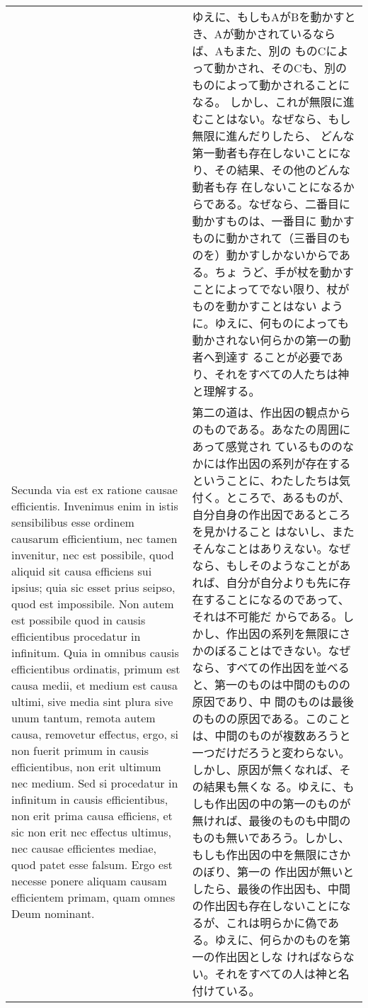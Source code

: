 \documentclass[10pt]{jsarticle}
\begin{document}
\begin{longtable}{p{21em}p{21em}}
&

ゆえに、もしもAがBを動かすとき、Aが動かされているならば、Aもまた、別の
ものCによって動かされ、そのCも、別のものによって動かされることになる。
しかし、これが無限に進むことはない。なぜなら、もし無限に進んだりしたら、
どんな第一動者も存在しないことになり、その結果、その他のどんな動者も存
在しないことになるからである。なぜなら、二番目に動かすものは、一番目に
動かすものに動かされて（三番目のものを）動かすしかないからである。ちょ
うど、手が杖を動かすことによってでない限り、杖がものを動かすことはない
ように。ゆえに、何ものによっても動かされない何らかの第一の動者へ到達す
ることが必要であり、それをすべての人たちは神と理解する。

\\

Secunda via est ex ratione causae efficientis. Invenimus enim in istis
sensibilibus esse ordinem causarum efficientium, nec tamen invenitur,
nec est possibile, quod aliquid sit causa efficiens sui ipsius; quia
sic esset prius seipso, quod est impossibile. Non autem est possibile
quod in causis efficientibus procedatur in infinitum. Quia in omnibus
causis efficientibus ordinatis, primum est causa medii, et medium est
causa ultimi, sive media sint plura sive unum tantum, remota autem
causa, removetur effectus, ergo, si non fuerit primum in causis
efficientibus, non erit ultimum nec medium. Sed si procedatur in
infinitum in causis efficientibus, non erit prima causa efficiens, et
sic non erit nec effectus ultimus, nec causae efficientes mediae, quod
patet esse falsum. Ergo est necesse ponere aliquam causam efficientem
primam, quam omnes Deum nominant.

&

第二の道は、作出因の観点からのものである。あなたの周囲にあって感覚され
ているもののなかには作出因の系列が存在するということに、わたしたちは気
付く。ところで、あるものが、自分自身の作出因であるところを見かけること
はないし、またそんなことはありえない。なぜなら、もしそのようなことがあ
れば、自分が自分よりも先に存在することになるのであって、それは不可能だ
からである。しかし、作出因の系列を無限にさかのぼることはできない。なぜ
なら、すべての作出因を並べると、第一のものは中間のものの原因であり、中
間のものは最後のものの原因である。このことは、中間のものが複数あろうと
一つだけだろうと変わらない。しかし、原因が無くなれば、その結果も無くな
る。ゆえに、もしも作出因の中の第一のものが無ければ、最後のものも中間の
ものも無いであろう。しかし、もしも作出因の中を無限にさかのぼり、第一の
作出因が無いとしたら、最後の作出因も、中間の作出因も存在しないことにな
るが、これは明らかに偽である。ゆえに、何らかのものを第一の作出因としな
ければならない。それをすべての人は神と名付けている。


\end{longtable}
\end{document}
